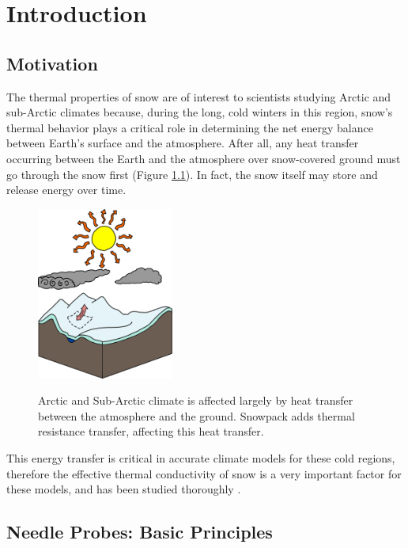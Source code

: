 \chapter{Introduction}
\label{sec:introduction}
\bigskip

\section{Motivation}
\label{sec:introduction:motivation}


The thermal properties of snow are of interest to scientists studying Arctic and
sub-Arctic climates because, during the long, cold winters in this region,
snow's thermal behavior plays a critical role in determining the net energy
balance between Earth's surface and the atmosphere. After all, any heat transfer
occurring between the Earth and the atmosphere over snow-covered ground must go
through the snow first (Figure \ref{fig:climate}). In fact, the snow
itself may store and release energy over time.

\begin{figure}[h]
\centering
\includegraphics[width=0.4\textwidth]{fig/climate.png}
\label{fig:climate}
\caption{Arctic and Sub-Arctic climate is affected largely by heat transfer
between the atmosphere and the ground. Snowpack adds thermal resistance
transfer, affecting this heat transfer.}
\end{figure}

This energy transfer is critical in accurate climate models for these cold
regions, therefore the effective thermal conductivity of snow is a very
important factor for these models, and has been studied thoroughly \cite{sturm1, sturm2, sturm3}.


\section{Needle Probes: Basic Principles}
\label{sec:introduction:needles}

